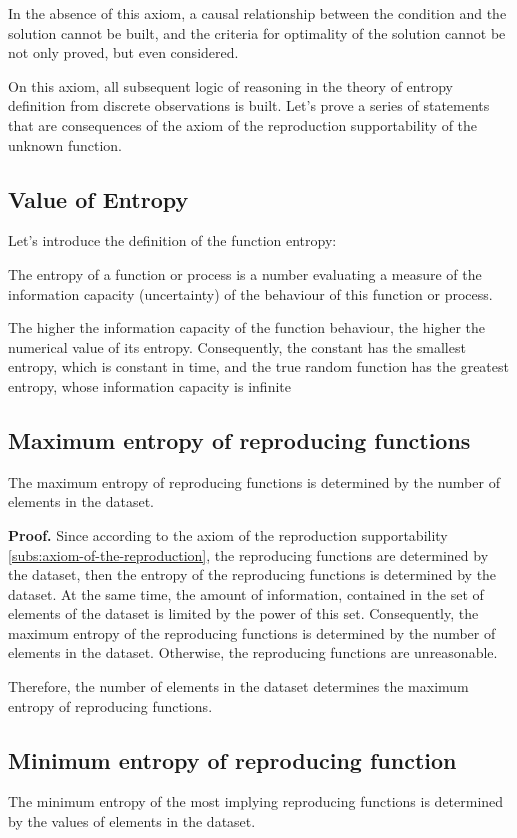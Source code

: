 \documentclass[a4paper, 11pt, oneside]{book}
\begin{document}
In the absence of this axiom, a causal relationship between the condition and the solution cannot be built, and the criteria for optimality of the solution cannot be not only proved, but even considered.

On this axiom, all subsequent logic of reasoning in the theory of entropy definition from discrete observations is built. Let's prove a series of statements that are consequences of the axiom of the reproduction supportability of the unknown function.

\subsection{Value of Entropy}
Let's introduce the definition of the function entropy:

The entropy of a function or process is a number evaluating a measure of the information capacity (uncertainty) of the behaviour of this function or process.

The higher the information capacity of the function behaviour, the higher the numerical value of its entropy. Consequently, the constant has the smallest entropy, which is constant in time, and the true random function has the greatest entropy, whose information capacity is infinite


\subsection{Maximum entropy of reproducing functions}\label{subs:maximum-entropy-limit}
The maximum entropy of reproducing functions is determined by the number of elements in the dataset.

\textbf{Proof.}
Since according to the axiom of the reproduction supportability \ref{subs:axiom-of-the-reproduction}, the reproducing functions are determined by the dataset, then the entropy of the reproducing functions is determined by the dataset. At the same time, the amount of information, contained in the set of elements of the dataset is limited by the power of this set. Consequently, the maximum entropy of the reproducing functions is determined by the number of elements in the dataset. Otherwise, the reproducing functions are unreasonable.

Therefore, the number of elements in the dataset determines the maximum entropy of reproducing functions.

\subsection{Minimum entropy of reproducing function}\label{subs:minimum-entropy-limit}
The minimum entropy of the most implying reproducing functions is determined by the values of elements in the dataset.
\end{document}
